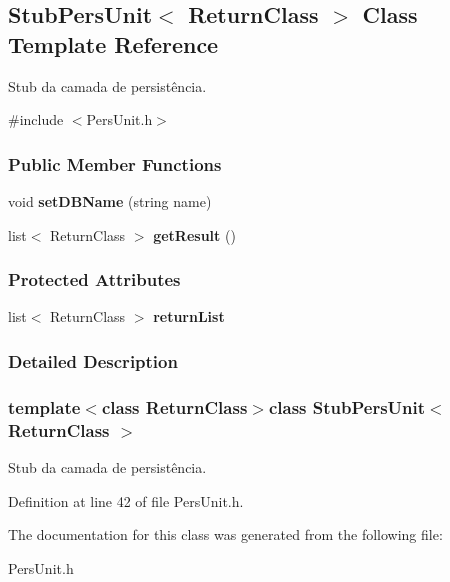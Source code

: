 \hypertarget{classStubPersUnit}{\subsection{Stub\-Pers\-Unit$<$ Return\-Class $>$ Class Template Reference}
\label{d5/dfd/classStubPersUnit}
}


Stub da camada de persistência.  




{\ttfamily \#include $<$Pers\-Unit.\-h$>$}

\subsubsection*{Public Member Functions}
\begin{DoxyCompactItemize}
\item 
\hypertarget{classStubPersUnit_a85372c81d59b3c7c765d013c8d34fec5}{void {\bfseries set\-D\-B\-Name} (string name)}\label{d5/dfd/classStubPersUnit_a85372c81d59b3c7c765d013c8d34fec5}

\item 
\hypertarget{classStubPersUnit_a6911707b204e735e1eab885e544dbd6c}{list$<$ Return\-Class $>$ {\bfseries get\-Result} ()}\label{d5/dfd/classStubPersUnit_a6911707b204e735e1eab885e544dbd6c}

\end{DoxyCompactItemize}
\subsubsection*{Protected Attributes}
\begin{DoxyCompactItemize}
\item 
\hypertarget{classStubPersUnit_af932467573f602fe0853e30be7d56f10}{list$<$ Return\-Class $>$ {\bfseries return\-List}}\label{d5/dfd/classStubPersUnit_af932467573f602fe0853e30be7d56f10}

\end{DoxyCompactItemize}


\subsubsection{Detailed Description}
\subsubsection*{template$<$class Return\-Class$>$class Stub\-Pers\-Unit$<$ Return\-Class $>$}

Stub da camada de persistência. 

Definition at line 42 of file Pers\-Unit.\-h.



The documentation for this class was generated from the following file\-:\begin{DoxyCompactItemize}
\item 
Pers\-Unit.\-h\end{DoxyCompactItemize}
